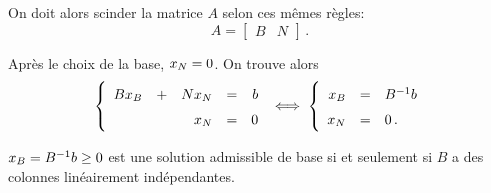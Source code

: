 	On doit alors scinder la matrice $A$ selon ces mêmes règles:
	\[
	A
	=
	\begin{bmatrix}
		B & N
	\end{bmatrix}\,.
	\]

	Après le choix de la base, $x_N = 0$.
	On trouve alors
	\[
	\renewcommand{\arraystretch}{1.5}
	\left\{
	\begin{array}{rcrcr}
		B \xb & + & N \xn & = & b\\
		      &   &   \xn & = & 0
	\end{array}
	\right.
	\iff
	\left\{
	\begin{array}{rcl}
		\xb & = & B^{-1} b\\
		\xn & = & 0\,.
	\end{array}
	\right.
	\]

	$x_B = B^{-1} b \ge 0$ est une solution admissible de base
	si et seulement si
	$B$ a des colonnes linéairement indépendantes.
